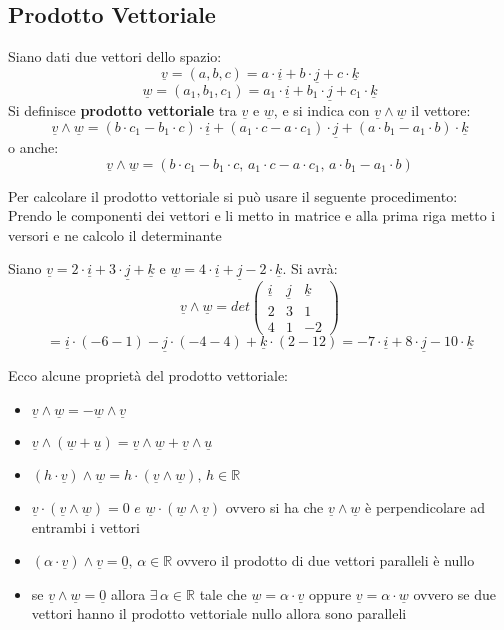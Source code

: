 \documentclass[a4paper,12pt, oneside]{book}
\begin{document}
\subsection{Prodotto Vettoriale}
\begin{definizione}
Siano dati due vettori dello spazio:
$$\underline{v}=(a,b,c)=a\cdot \underline{i}+b\cdot \underline{j}+c\cdot \underline{k}$$
$$\underline{w}=(a_1,b_1,c_1)=a_1\cdot \underline{i}+b_1\cdot \underline{j}+c_1\cdot \underline{k}$$
Si definisce \textbf{prodotto vettoriale} tra $\underline{v}$ e $\underline{w}$, e si indica con $\underline{v}\land\underline{w}$ il vettore:
$$\underline{v}\land\underline{w}=(b\cdot c_1-b_1\cdot c)\cdot \underline{i}+(a_1\cdot c-a\cdot c_1)\cdot\underline{j}+(a\cdot b_1-a_1\cdot b)\cdot \underline{k}$$
o anche:
$$\underline{v}\land\underline{w}=(b\cdot c_1-b_1\cdot c,\,a_1\cdot c-a\cdot c_1,\,a\cdot b_1-a_1\cdot b)$$
\end{definizione}
\begin{nota}
Per calcolare il prodotto vettoriale si può usare il seguente procedimento:\\
Prendo le componenti dei vettori e li metto in matrice e alla prima riga metto i versori e ne calcolo il determinante
\begin{esempio}
Siano $\underline{v}=2\cdot \underline{i}+3\cdot \underline{j}+ \underline{k}$ e $\underline{w}=4\cdot \underline{i}+ \underline{j}-2\cdot \underline{k}$. Si avrà:
$$
\underline{v}\land\underline{w}=det\left(\begin{matrix}
\underline{i} & \underline{j} & \underline{k}\\
2 & 3 & 1\\
4 & 1 & -2
\end{matrix}\right)
$$
$$=\underline{i}\cdot (-6-1)-\underline{j}\cdot (-4-4)+\underline{k}\cdot(2-12)=-7\cdot \underline{i}+8\cdot \underline{j}-10\cdot \underline{k}$$
\end{esempio}
\end{nota}
\newpage
Ecco alcune proprietà del prodotto vettoriale:
\begin{itemize}
\item $\underline{v}\land\underline{w}=-\underline{w}\land\underline{v}$
\item $\underline{v}\land(\underline{w}+\underline{u})=\underline{v}\land \underline{w}+\underline{v}\land \underline{u}$
\item $(h\cdot \underline{v})\land \underline{w}=h\cdot (\underline{v}\land \underline{w}),\, h\in\mathbb{R}$
\item $\underline{v}\cdot (\underline{v}\land \underline{w})=0\,\, e\,\,\underline{w}\cdot (\underline{w}\land \underline{v})$ ovvero si ha che $\underline{v}\land\underline{w}$ è perpendicolare ad entrambi i vettori
\item $(\alpha\cdot \underline{v})\land \underline{v}=\underline{0},\,\alpha\in\mathbb{R}$ ovvero il prodotto di due vettori paralleli è nullo
\item se $\underline{v}\land \underline{w}=\underline{0}$ allora $\exists\, \alpha\in\mathbb{R}$ tale che $\underline{w}=\alpha\cdot \underline{v}$ oppure $\underline{v}=\alpha\cdot \underline{w}$ ovvero se due vettori hanno il prodotto vettoriale nullo allora sono paralleli
\end{itemize}
\end{document}
